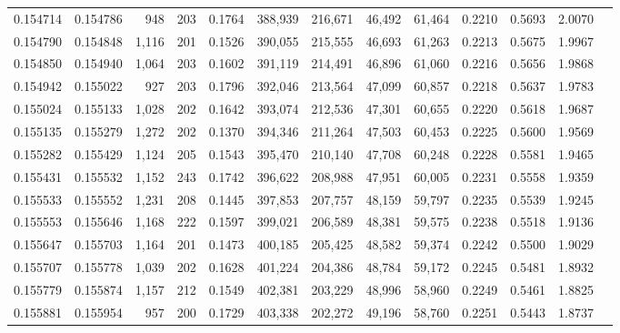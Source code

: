 \begin{tabular}{rrrrrrrrrrrrr}
0.154714 & 0.154786 &   948 & 203 &                                     0.1764 & 388,939 & 216,671 &  46,492 &  61,464 & 0.2210 & 0.5693 & 2.0070 \\
0.154790 & 0.154848 & 1,116 & 201 &                                     0.1526 & 390,055 & 215,555 &  46,693 &  61,263 & 0.2213 & 0.5675 & 1.9967 \\
0.154850 & 0.154940 & 1,064 & 203 &                                     0.1602 & 391,119 & 214,491 &  46,896 &  61,060 & 0.2216 & 0.5656 & 1.9868 \\
0.154942 & 0.155022 &   927 & 203 &                                     0.1796 & 392,046 & 213,564 &  47,099 &  60,857 & 0.2218 & 0.5637 & 1.9783 \\
0.155024 & 0.155133 & 1,028 & 202 &                                     0.1642 & 393,074 & 212,536 &  47,301 &  60,655 & 0.2220 & 0.5618 & 1.9687 \\
0.155135 & 0.155279 & 1,272 & 202 &                                     0.1370 & 394,346 & 211,264 &  47,503 &  60,453 & 0.2225 & 0.5600 & 1.9569 \\
0.155282 & 0.155429 & 1,124 & 205 &                                     0.1543 & 395,470 & 210,140 &  47,708 &  60,248 & 0.2228 & 0.5581 & 1.9465 \\
0.155431 & 0.155532 & 1,152 & 243 &                                     0.1742 & 396,622 & 208,988 &  47,951 &  60,005 & 0.2231 & 0.5558 & 1.9359 \\
0.155533 & 0.155552 & 1,231 & 208 &                                     0.1445 & 397,853 & 207,757 &  48,159 &  59,797 & 0.2235 & 0.5539 & 1.9245 \\
0.155553 & 0.155646 & 1,168 & 222 &                                     0.1597 & 399,021 & 206,589 &  48,381 &  59,575 & 0.2238 & 0.5518 & 1.9136 \\
0.155647 & 0.155703 & 1,164 & 201 &                                     0.1473 & 400,185 & 205,425 &  48,582 &  59,374 & 0.2242 & 0.5500 & 1.9029 \\
0.155707 & 0.155778 & 1,039 & 202 &                                     0.1628 & 401,224 & 204,386 &  48,784 &  59,172 & 0.2245 & 0.5481 & 1.8932 \\
0.155779 & 0.155874 & 1,157 & 212 &                                     0.1549 & 402,381 & 203,229 &  48,996 &  58,960 & 0.2249 & 0.5461 & 1.8825 \\
0.155881 & 0.155954 &   957 & 200 &                                     0.1729 & 403,338 & 202,272 &  49,196 &  58,760 & 0.2251 & 0.5443 & 1.8737 \\

\end{tabular}
